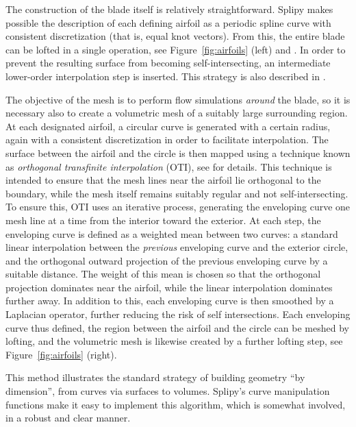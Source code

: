 \documentclass[preprint,12pt, a4paper]{elsarticle}
\begin{document}
The construction of the blade itself is relatively straightforward.
Splipy makes possible the description of each defining airfoil as a periodic spline curve with consistent discretization (that is, equal knot vectors).
From this, the entire blade can be lofted in a single operation, see Figure~\ref{fig:airfoils} (left) and \cite{Fonn2015sbm}.
In order to prevent the resulting surface from becoming self-intersecting, an intermediate lower-order interpolation step is inserted.
This strategy is also described in \cite{Fonn2015sbm}.

The objective of the mesh is to perform flow simulations \emph{around} the blade, so it is necessary also to create a volumetric mesh of a suitably large surrounding region.
At each designated airfoil, a circular curve is generated with a certain radius, again with a consistent discretization in order to facilitate interpolation.
The surface between the airfoil and the circle is then mapped using a technique known as \emph{orthogonal transfinite interpolation} (OTI), see \cite{Fonn2015sbm} for details.
This technique is intended to ensure that the mesh lines near the airfoil lie orthogonal to the boundary, while the mesh itself remains suitably regular and not self-intersecting.
To ensure this, OTI uses an iterative process, generating the enveloping curve one mesh line at a time from the interior toward the exterior.
At each step, the enveloping curve is defined as a weighted mean between two curves: a standard linear interpolation between the \emph{previous} enveloping curve and the exterior circle, and the orthogonal outward projection of the previous enveloping curve by a suitable distance.
The weight of this mean is chosen so that the orthogonal projection dominates near the airfoil, while the linear interpolation dominates further away.
In addition to this, each enveloping curve is then smoothed by a Laplacian operator, further reducing the risk of self intersections.
Each enveloping curve thus defined, the region between the airfoil and the circle can be meshed by lofting, and the volumetric mesh is likewise created by a further lofting step, see Figure~\ref{fig:airfoils} (right).

This method illustrates the standard strategy of building geometry ``by dimension'', from curves via surfaces to volumes.
Splipy's curve manipulation functions make it easy to implement this algorithm, which is somewhat involved, in a robust and clear manner.
\end{document}
